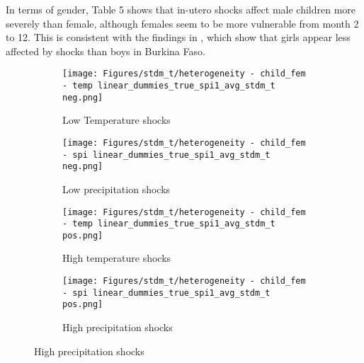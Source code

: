 \documentclass[a4paper]{article}
\begin{document}
In terms of gender, Table 5 shows that in-utero shocks affect male children more severely than female, although females seem to be more vulnerable from month 2 to 12. This is consistent with the findings in \cite{borjean2012}, which show that girls appear less affected by shocks than boys in Burkina Faso. 

\begin{figure}[h!]
    \caption{Climate shocks impacts on gender}
    \centering
    \begin{subfigure}[t]{0.45\textwidth}
        \centering
        \texttt{[image: Figures/stdm\_t/heterogeneity - child\_fem - temp linear\_dummies\_true\_spi1\_avg\_stdm\_t neg.png]}
        \caption{Low Temperature shocks}
    \end{subfigure}%
    \begin{subfigure}[t]{0.45\textwidth}
        \centering
        \texttt{[image: Figures/stdm\_t/heterogeneity - child\_fem - spi linear\_dummies\_true\_spi1\_avg\_stdm\_t neg.png]}
        \caption{Low precipitation shocks}
    \end{subfigure} \hfill
    \begin{subfigure}[t]{0.45\textwidth}
        \centering
        \texttt{[image: Figures/stdm\_t/heterogeneity - child\_fem - temp linear\_dummies\_true\_spi1\_avg\_stdm\_t pos.png]}
        \caption{High temperature shocks}    
    \end{subfigure}
    \begin{subfigure}[t]{0.45\textwidth}
        \centering
        \texttt{[image: Figures/stdm\_t/heterogeneity - child\_fem - spi linear\_dummies\_true\_spi1\_avg\_stdm\_t pos.png]}
        \caption{High precipitation shocks}    
    \end{subfigure}
\end{figure}
\end{document}
